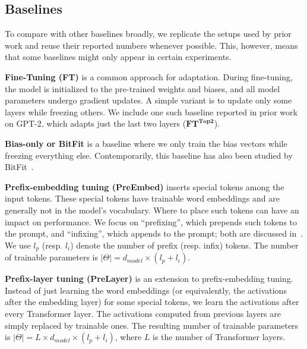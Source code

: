 \subsection{Baselines}
\label{sec:expt_baselines}
To compare with other baselines broadly, we replicate the setups used by prior work and reuse their reported numbers whenever possible. This, however, means that some baselines might only appear in certain experiments.

\textbf{Fine-Tuning (FT)} is a common approach for adaptation. During fine-tuning, the model is initialized to the pre-trained weights and biases, and all model parameters undergo gradient updates. A simple variant is to update only some layers while freezing others. We include one such baseline reported in prior work~\citep{li_prefix-tuning_2021} on GPT-2, which adapts just the last two layers ($\textbf{FT}^{\textbf{Top2}}$).

\textbf{Bias-only or BitFit} is a baseline where we only train the bias vectors while freezing everything else. Contemporarily, this baseline has also been studied by BitFit~\citep{zaken2021bitfit}.

\textbf{Prefix-embedding tuning (PreEmbed)} inserts special tokens among the input tokens. These special tokens have trainable word embeddings and are generally not in the model's vocabulary. Where to place such tokens can have an impact on performance. We focus on ``prefixing'', which prepends such tokens to the prompt, and ``infixing'', which appends to the prompt; both are discussed in~\citet{li_prefix-tuning_2021}.
We use $l_{p}$ (resp. $l_{i}$) denote the number of prefix (resp. infix) tokens. The number of trainable parameters is $|\Theta| = d_{model} \times (l_p + l_i)$. 

\textbf{Prefix-layer tuning (PreLayer)} is an extension to prefix-embedding tuning. Instead of just learning the word embeddings (or equivalently, the activations after the embedding layer) for some special tokens, we learn the activations after every Transformer layer. The activations computed from previous layers are simply replaced by trainable ones. The resulting number of trainable parameters is $|\Theta| = L \times d_{model} \times (l_p + l_i)$, where $L$ is the number of Transformer layers.

